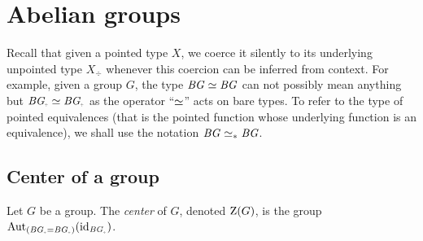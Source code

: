 \section{Abelian groups}
\label{sec:abelian-groups}

Recall that given a pointed type $X$, we coerce it silently to its
underlying unpointed type $X_\div$ whenever this coercion can be
inferred from context. For example, given a group $G$, the type
$\mathit{B}\mathit{G}\simeq \mathit{B}\mathit{G}$ can not possibly mean anything but
$\BG_\div\simeq \BG_\div$ as the operator ``$\simeq$'' acts on
bare types. To refer to the type of pointed equivalences (that is the
pointed function whose underlying function is an equivalence), we
shall use the notation $\mathit{B}\mathit{G} \simeq_\ast \mathit{B}\mathit{G}$.%
%

\subsection{Center of a group}
\label{sec:center-group}

\begin{definition}
  Let $G$ be a group. The {\em center} of $G$, denoted
  $\grpcenter(G)$, is the group
  $\Aut_{(\BG_\div=\BG_\div)}(\id_{\BG_\div})$.%
\end{definition}

